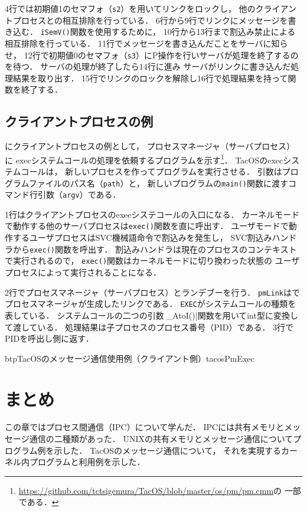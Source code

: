 4行では初期値1のセマフォ（{\tt s2}）を用いてリンクをロックし，
他のクライアントプロセスとの相互排除を行っている．
6行から9行でリンクにメッセージを書き込む．
{\tt iSemV()}関数を使用するために，
10行から13行まで割込み禁止による相互排除を行っている．
11行でメッセージを書き込んだことをサーバに知らせ，
12行で初期値0のセマフォ（{\tt s3}）にP操作を行いサーバが処理を終了するのを待つ．
サーバの処理が終了したら14行に進み
サーバがリンクに書き込んだ処理結果を取り出す．
15行でリンクのロックを解除し16行で処理結果を持って関数を終了する．

\subsection{クライアントプロセスの例}
にクライアントプロセスの例として，
プロセスマネージャ（サーバプロセス）に
execシステムコールの処理を依頼するプログラムを示す\footnote{
\url{https://github.com/tctsigemura/TacOS/blob/master/os/pm/pm.cmm}の
一部である．}．
TacOSのexecシステムコールは，
新しいプロセスを作ってプログラムを実行させる．
引数はプログラムファイルのパス名（{\tt path}）と，
新しいプログラムの{\tt main()}関数に渡すコマンド行引数（{\tt argv}）である．

1行はクライアントプロセスのexecシステコールの入口になる．
カーネルモードで動作する他のサーバプロセスは{\tt exec()}関数を直に呼出す．
ユーザモードで動作するユーザプロセスはSVC機械語命令で割込みを発生し，
SVC割込みハンドラから{\tt exec()}関数を呼出す．
割込みハンドラは現在のプロセスのコンテキストで実行されるので，
{\tt exec()}関数はカーネルモードに切り換わった状態の
ユーザプロセスによって実行されることになる．

2行でプロセスマネージャ（サーバプロセス）とランデブーを行う．
{\tt pmLink}はで
プロセスマネージャが生成したリンクである．
{\tt EXEC}がシステムコールの種類を表している．
システムコールの二つの引数は\|_AtoI()|関数を用いてint型に変換して渡している．
処理結果は子プロセスのプロセス番号（PID）である．
3行でPIDを呼出し側に返す．

\begin{myfig}{btp}{TacOSのメッセージ通信使用例（クライアント側）}{tacosPmExec}

\end{myfig}

\section{まとめ}
この章ではプロセス間通信（IPC）について学んだ．
IPCには共有メモリとメッセージ通信の二種類があった．
UNIXの共有メモリとメッセージ通信についてプログラム例を示した．
TacOSのメッセージ通信について，
それを実現するカーネル内プログラムと利用例を示した．

